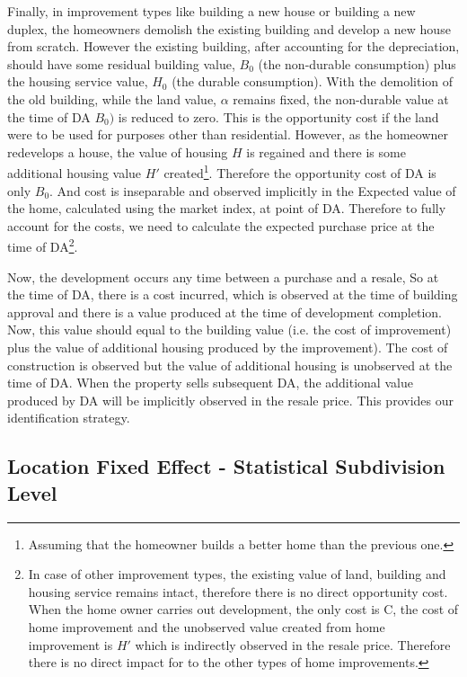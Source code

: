  
Finally, in improvement types like building a new house or building a new duplex, the homeowners demolish the existing building and develop a new house from scratch. However the existing building, after accounting for the depreciation, should have some residual building value, $B_0$ (the non-durable consumption) plus the housing service value, $H_0$ (the durable consumption). With the demolition of the old building, while the land value, $\alpha$ remains fixed, the non-durable value at the time of DA $B_0)$ is reduced to zero. This is the opportunity cost if the land were to be used for purposes other than residential. However, as the homeowner redevelops a house, the value of housing $H$ is regained and there is some additional housing value $H'$ created\footnote{Assuming that the homeowner builds a better home than the previous one.}. Therefore the opportunity cost of DA is only $B_0$. And cost is inseparable and observed implicitly in the Expected value of the home, calculated using the market index, at point of DA. Therefore to fully account for the costs, we need to calculate the expected purchase price at the time of DA\footnote{In case of other improvement types, the existing value of land, building and housing service remains intact, therefore there is no direct opportunity cost. When the home owner carries out development, the only cost is C, the cost of home improvement and the unobserved value created from home improvement is $H'$ which is indirectly observed in the resale price. Therefore there is no direct impact for to the other types of home improvements.}. 
 
 
 Now, the development occurs any time between a purchase and a resale, So at the time of DA, there is a cost incurred, which is observed at the time of building approval and there is a value produced at the time of development completion. Now, this value should equal to the building value (i.e. the cost of improvement) plus the value of additional housing produced by the improvement). The cost of construction is observed but the value of additional housing is unobserved at the time of DA. When the property sells subsequent DA, the additional value produced by DA will be implicitly observed in the resale price. This provides our identification strategy. 
 
 
 
 
 \subsection{Location Fixed Effect - Statistical Subdivision Level}

